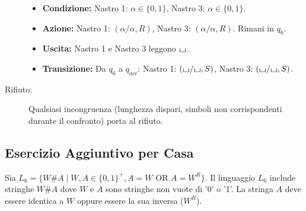 \documentclass[a4paper]{article}
\theoremstyle{definition} %
\newcommand{\blankS}{\ensuremath{\raisebox{-0.15ex}{\scalebox{1.3}[0.7]{$\sqcup$}}}}
\begin{document}
\begin{description}
    \begin{itemize}
        \item \textbf{Condizione:} Nastro 1: $\alpha \in \{0,1\}$, Nastro 3: $\alpha \in \{0,1\}$.
        \item \textbf{Azione:} Nastro 1: $(\alpha/\alpha, R)$, Nastro 3: $(\alpha/\alpha, R)$. Rimani in $q_6$.
        \item \textbf{Uscita:} Nastro 1 e Nastro 3 leggono $\blankS$.
        \item \textbf{Transizione:} Da $q_6$ a $q_{acc}$: Nastro 1: $(\blankS/\blankS, S)$, Nastro 3: $(\blankS/\blankS, S)$.
    \end{itemize}
    \item[Rifiuto:] Qualsiasi incongruenza (lunghezza dispari, simboli non corrispondenti durante il confronto) porta al rifiuto.
\end{description}

\subsection{Esercizio Aggiuntivo per Casa}
Sia $L_6 = \{W\#A \mid W,A \in \{0,1\}^+, A=W \text{ OR } A=W^R\}$.
Il linguaggio $L_6$ include stringhe $W\#A$ dove $W$ e $A$ sono stringhe non vuote di '0' o '1'. La stringa $A$ deve essere identica a $W$ oppure essere la sua inversa ($W^R$).
\end{document}
